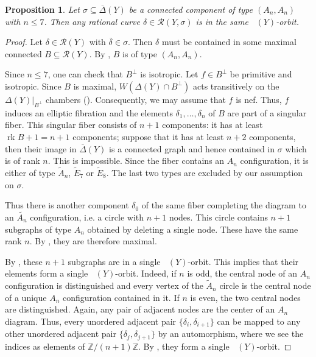 \documentclass[a4paper]{amsart}
\theoremstyle{definition}
\theoremstyle{plain}
\newtheorem{proposition}[definition]{Proposition}
\DeclareMathOperator{\rk}{rk}
\DeclareMathOperator{\aut}{Aut^*}
\newcommand{\ZZ}{\mathbb{Z}}
\newcommand{\R}{\mathcal{R}}
\newcommand{\DeltabarY}{\overline{\Delta}(Y)}
\begin{document}
\begin{proposition}\label{lemma:An-transitive}
Let $\sigma \subseteq \DeltabarY$ be a connected component of type $(A_n,A_n)$ with $n \leq 7$.
Then any rational curve $\delta \in \R(Y,\sigma)$ is in the same $\aut(Y)$-orbit.
\end{proposition}
\begin{proof}
Let $\delta \in \R(Y)$ with $\overline{\delta} \in \sigma$. Then $\delta$ must be contained in some maximal connected $B \subseteq \R(Y)$. By , $B$ is of type $(A_n,A_n)$.

Since $n\leq 7$, one can check that $B^\perp$ is isotropic.
Let $f \in B^\perp$ be primitive and isotropic. Since $B$ is maximal, $W(\Delta(Y)\cap B^\perp)$ acts transitively on the $\Delta(Y)|_{B^\perp}$ chambers (). Consequently, we may assume that $f$ is nef. Thus, $f$ induces an elliptic fibration and the elements $\delta_1,\dots,\delta_n$ of $B$ are part of a singular fiber.
This singular fiber consists of $n+1$ components: it has at least $\rk B+1 = n+1$ components; suppose that it has at least $n+2$ components, then their image in $\DeltabarY$ is a connected graph and hence contained in $\sigma$ which is of rank $n$. This is impossible.
Since the fiber contains an $A_n$ configuration, it is either of type $\widetilde{A}_n$, $\widetilde{E}_7$ or $\widetilde{E}_8$. The last two types are excluded by our assumption on $\sigma$.

Thus there is another component $\delta_{0}$ of the same fiber completing the diagram to an $\widetilde{A_n}$ configuration, i.e. a circle with $n+1$ nodes. This circle contains $n+1$ subgraphs of type $A_n$ obtained by deleting a single node.
These have the same rank $n$. By , they are therefore maximal. 

By , these $n+1$ subgraphs are in a single $\aut(Y)$-orbit.
This implies that their elements form a single $\aut(Y)$-orbit.
Indeed, if $n$ is odd, the central node of an $A_n$ configuration is distinguished and every vertex of the $\widetilde{A}_n$ circle is the central node of a unique $A_n$ configuration contained in it.
If $n$ is even, the two central nodes are distinguished. Again, any pair of adjacent nodes are the center of an $A_n$ diagram. Thus, every unordered adjacent pair $\{\delta_i,\delta_{i+1}\}$ can be mapped to any other unordered adjacent pair $\{\delta_j,\delta_{j+1}\}$ by an automorphism, where we see the indices as elements of $\ZZ/(n+1)\ZZ$. By , they form a single $\aut(Y)$-orbit.
\end{proof}
\end{document}
